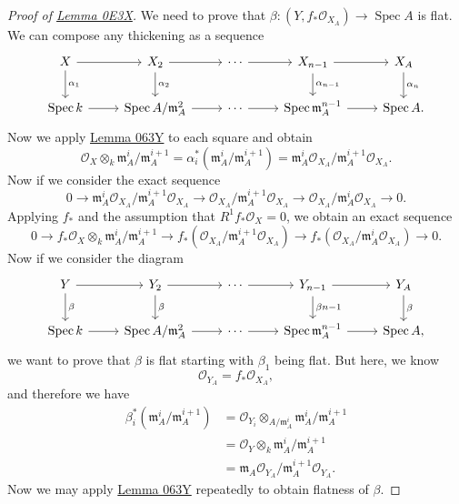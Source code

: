 \documentclass[leqno, openany]{memoir}
\theoremstyle{definition}
\theoremstyle{remark}
\theoremstyle{plain}
\theoremstyle{definition}
\theoremstyle{remark}
\newcommand{\mc}[1]{\mathcal{#1}}
\newcommand{\mf}[1]{\mathfrak{#1}}
\DeclareMathOperator{\spec}{Spec}
\DeclareMathOperator{\Spec}{Spec}
\begin{document}
\begin{proof}[Proof of \href{https://stacks.math.columbia.edu/tag/0E3X}{Lemma 0E3X}]
    We need to prove that $\beta \colon (Y, f_* \mc{O}_{X_A}) \to \spec A$ is flat. We can compose any thickening as a sequence
    \begin{equation*}
    \begin{tikzcd}
        X \ar{r} \ar{d}{\alpha_1} & X_2 \ar{d}{\alpha_2} \ar{r} & \cdots \ar{r} & X_{n-1} \ar{d}{\alpha_{n-1}} \ar{r} & X_A \ar{d}{\alpha_n} \\
        \Spec k \ar{r} & \Spec A/\mf{m}_A^2 \ar{r} & \cdots \ar{r} & \Spec \mf{m}_A^{n-1} \ar{r} & \Spec A.
    \end{tikzcd}
    \end{equation*}
    Now we apply \href{}{Lemma 063Y} to each square and obtain
    \[ \mc{O}_X \otimes_k \mf{m}_A^i / \mf{m}_A^{i+1} = \alpha_i^* (\mf{m}_A^i / \mf{m}_A^{i+1}) = \mf{m}_A^i \mc{O}_{X_A} / \mf{m}_A^{i+1} \mc{O}_{X_A}. \]
    Now if we consider the exact sequence
    \[ 0 \to \mf{m}_A^i \mc{O}_{X_A} / \mf{m}_A^{i+1} \mc{O}_{X_A} \to \mc{O}_{X_A} / \mf{m}_A^{i+1} \mc{O}_{X_A} \to \mc{O}_{X_A} / \mf{m}_A^i \mc{O}_{X_A} \to 0. \]
    Applying $f_*$ and the assumption that $R^1 f_* \mc{O}_X = 0$, we obtain an exact sequence
    \[ 0 \to f_* \mc{O}_X \otimes_k \mf{m}_A^i / \mf{m}_A^{i+1} \to f_* (\mc{O}_{X_A} / \mf{m}_A^{i+1} \mc{O}_{X_A}) \to f_* (\mc{O}_{X_A} / \mf{m}_A^i \mc{O}_{X_A}) \to 0. \]
    Now if we consider the diagram
    \begin{equation*}
    \begin{tikzcd}
        Y \ar{r} \ar{d}{\beta} & Y_2 \ar{d}{\beta} \ar{r} & \cdots \ar{r} & Y_{n-1} \ar{d}{\beta{n-1}} \ar{r} & Y_A \ar{d}{\beta} \\
        \Spec k \ar{r} & \Spec A/\mf{m}_A^2 \ar{r} & \cdots \ar{r} & \Spec \mf{m}_A^{n-1} \ar{r} & \Spec A,
    \end{tikzcd}
    \end{equation*}
    we want to prove that $\beta$ is flat starting with $\beta_1$ being flat. But here, we know
    \[ \mc{O}_{Y_A} = f_* \mc{O}_{X_A}, \]
    and therefore we have
    \begin{align*}
        \beta_i^* (\mf{m}_A^i / \mf{m}_A^{i+1}) &= \mc{O}_{Y_i} \otimes_{A/\mf{m}_A^i} \mf{m}_A^i / \mf{m}_A^{i+1} \\
        &= \mc{O}_Y \otimes_k \mf{m}_A^i / \mf{m}_A^{i+1} \\
        &= \mf{m}_A \mc{O}_{Y_A} / \mf{m}_A^{i+1} \mc{O}_{Y_A}.
    \end{align*}
    Now we may apply \href{https://stacks.math.columbia.edu/tag/063Y}{Lemma 063Y} repeatedly to obtain flatness of $\beta$.
\end{proof}
\end{document}
